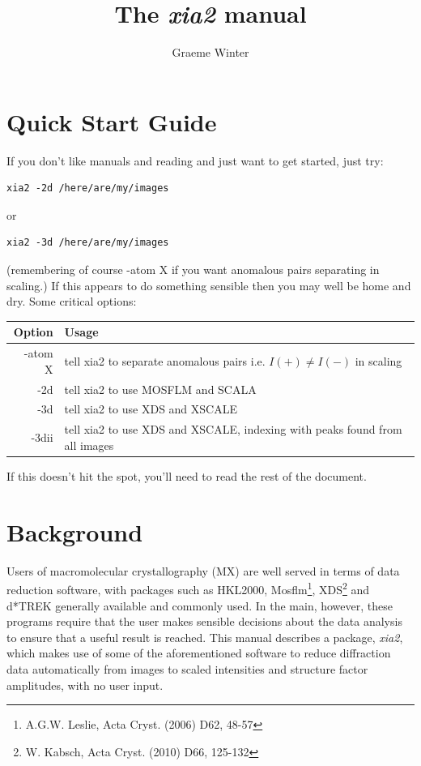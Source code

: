 \documentclass[a4paper, 11pt]{article}
\title{The \emph{xia2} manual}
\author{Graeme Winter}
\begin{document}
\maketitle
\clearpage

\tableofcontents

\section{Quick Start Guide}

If you don't like manuals and reading and just want to get started,
just try:

\begin{verbatim}
xia2 -2d /here/are/my/images
\end{verbatim}

\noindent
or

\begin{verbatim}
xia2 -3d /here/are/my/images
\end{verbatim}

\noindent
(remembering of course -atom X if you want anomalous pairs separating
in scaling.) If this appears to do something sensible then you may
well be home and dry. Some critical options:

\begin{center}
\begin{tabular}{|r|p{6cm}|}
\hline
Option & Usage \\
\hline
-atom X & tell xia2 to separate anomalous pairs i.e. $I(+) \ne I(-)$ in 
scaling \\
-2d & tell xia2 to use MOSFLM and SCALA \\
-3d & tell xia2 to use XDS and XSCALE \\
-3dii & tell xia2 to use XDS and XSCALE, indexing with peaks found from
all images \\
\hline
\end{tabular}
\end{center}

If this doesn't hit the spot, you'll need to read the rest of the document.

\section{Background}

Users of macromolecular crystallography (MX) are well served in terms of
data reduction software, with packages such as HKL2000, 
Mosflm\footnote{A.G.W. Leslie, Acta Cryst. (2006) D62, 48-57},
XDS\footnote{W. Kabsch, Acta Cryst. (2010) D66, 125-132} and 
d*TREK generally available and commonly used. In the main, however, these
programs require that the user makes sensible decisions about the data 
analysis to ensure that a useful result is reached. This manual describes
a package, \emph{xia2}, which makes use of some of the aforementioned 
software to reduce diffraction data automatically from images to scaled 
intensities and structure factor amplitudes, with no user input.
\end{document}

